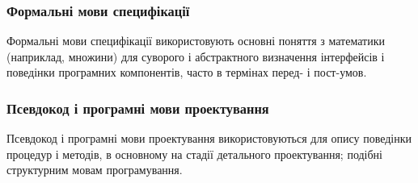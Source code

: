 \subsubsection{Формальні мови специфікації}
Формальні мови специфікації використовують основні поняття з математики (наприклад, множини) для суворого і абстрактного визначення інтерфейсів і поведінки програмних компонентів, часто в термінах перед- і пост-умов.

\subsubsection{Псевдокод і програмні мови проектування}
Псевдокод і програмні мови проектування використовуються для опису поведінки процедур і методів, в основному на стадії детального проектування; подібні структурним мовам програмування.


